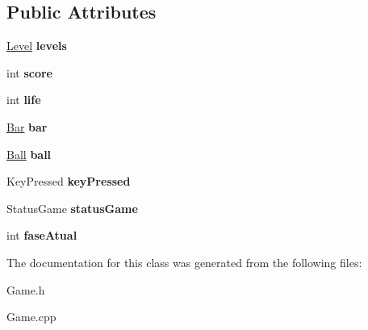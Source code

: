 \subsection*{\-Public \-Attributes}
\begin{DoxyCompactItemize}
\item 
\hypertarget{classGame_aeb382a6e4f4707b9b8fadbc18fc302b0}{\hyperlink{classLevel}{\-Level} {\bfseries levels}}\label{classGame_aeb382a6e4f4707b9b8fadbc18fc302b0}

\item 
\hypertarget{classGame_afaf9404196df9968103d5b0d0ad08139}{int {\bfseries score}}\label{classGame_afaf9404196df9968103d5b0d0ad08139}

\item 
\hypertarget{classGame_aaedfa82bf9e253bd98aa25783b252725}{int {\bfseries life}}\label{classGame_aaedfa82bf9e253bd98aa25783b252725}

\item 
\hypertarget{classGame_a3d942c50ee0e410deaaa993b368f3b61}{\hyperlink{classBar}{\-Bar} {\bfseries bar}}\label{classGame_a3d942c50ee0e410deaaa993b368f3b61}

\item 
\hypertarget{classGame_a5672c77759345eaea4d9000cb51bb391}{\hyperlink{classBall}{\-Ball} {\bfseries ball}}\label{classGame_a5672c77759345eaea4d9000cb51bb391}

\item 
\hypertarget{classGame_a35ea9f149a535c464f39eb8c63762e9c}{\-Key\-Pressed {\bfseries key\-Pressed}}\label{classGame_a35ea9f149a535c464f39eb8c63762e9c}

\item 
\hypertarget{classGame_af77c857f4fab8d05dfe3153a29451928}{\-Status\-Game {\bfseries status\-Game}}\label{classGame_af77c857f4fab8d05dfe3153a29451928}

\item 
\hypertarget{classGame_ae36fc8698f6f8f895c21f368580d6536}{int {\bfseries fase\-Atual}}\label{classGame_ae36fc8698f6f8f895c21f368580d6536}

\end{DoxyCompactItemize}


\-The documentation for this class was generated from the following files\-:\begin{DoxyCompactItemize}
\item 
\-Game.\-h\item 
\-Game.\-cpp\end{DoxyCompactItemize}
